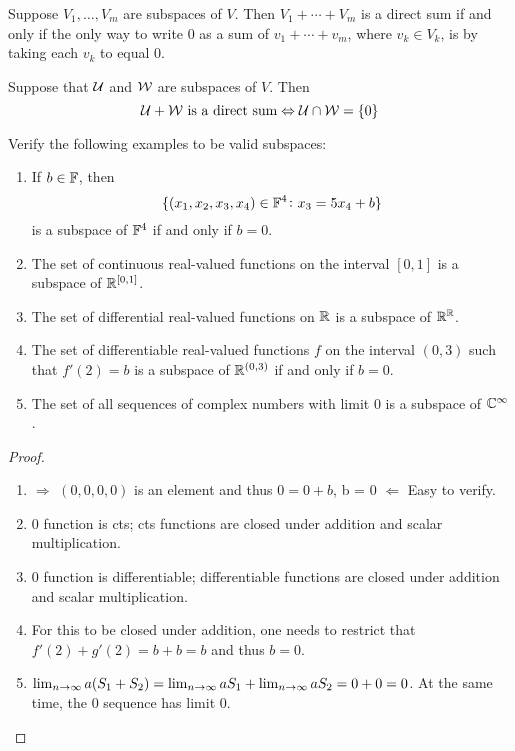 \documentclass{extarticle}
\begin{document}
\begin{thm}
    Suppose \(V_1, \ldots, V_m\) are subspaces of \(V\). Then \(V_1 + \cdots + V_m\) 
    is a direct sum if and only if the only way to write 0 as a sum of \(v_1 + \cdots + v_m\),
    where \(v_k \in V_k\), is by taking each \(v_k\) to equal 0. 
\end{thm}

\begin{thm}
    Suppose that \(\mathcal{U}\) and \(\mathcal{W}\) are subspaces of \(V\). Then 
    \[\mathcal{U} + \mathcal{W} \text{ is a direct sum} \Leftrightarrow \mathcal{U} \cap \mathcal{W} = \{0\}\]
\end{thm}


\begin{problem}{1}
Verify the following examples to be valid subspaces:
\begin{enumerate}
    \item If \(b \in \mathbb{F}\), then 
    \[\{(x_1, x_2, x_3, x_4) \in \mathbb{F}^4 \colon x_3 = 5x_4 + b\} \]
    is a subspace of \(\mathbb{F}^4\) if and only if \(b = 0\).
    \item The set of continuous real-valued functions on the interval \([0, 1]\) is 
    a subspace of \(\mathbb{R}^{[0,1]}\). 
    \item The set of differential real-valued functions on \(\mathbb{R}\) is a subspace of \(\mathbb{R}^{\mathbb{R}}\).
    \item The set of differentiable real-valued functions \(f\) on the interval \((0,3)\)
    such that \(f'(2) = b\) is a subspace of \(\mathbb{R}^{(0,3)}\) if and only if \(b=0\).
    \item The set of all sequences of complex numbers with limit 0 is a subspace of \(\mathbb{C}^\infty\).
\end{enumerate}
\end{problem}



\begin{proof}
\begin{enumerate}
    \item \(\Rightarrow\) \((0, 0, 0, 0)\) is an element and thus \(0 = 0 + b\), b = 0 
    \(\Leftarrow\) Easy to verify. 
    \item 0 function is cts; cts functions are closed under addition and scalar multiplication.
    \item 0 function is differentiable; differentiable functions are closed under addition and 
    scalar multiplication. 
    \item For this to be closed under addition, one needs to restrict that \(f'(2) + g'(2) = b + b = b\) and thus 
    \(b = 0\).
    \item \(\lim_{n \to \infty} a(S_1 + S_2) = \lim_{n \to \infty} a S_1 + \lim_{n \to \infty} aS_2 = 0 + 0 = 0\). At the same time, 
    the 0 sequence has limit 0.
\end{enumerate}
\end{proof}
\end{document}
